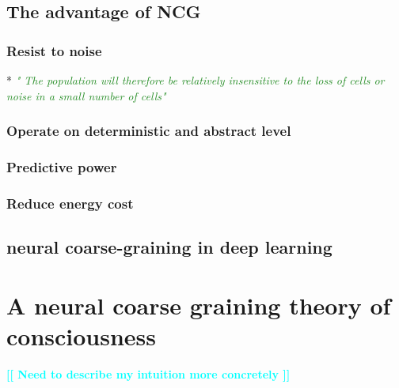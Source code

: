 \documentclass[utf8]{article}
\makeatletter
\newcommand{\rewrite}[1]{\textcolor{ForestGreen}{\textit{"#1"}}\newline}
\newcommand{\toWrite}[1]{\noindent
			\textcolor{Cyan}{\textbf{[[ #1 ]]}}}
\newcommand{\martin}[1]{\todo[color=SpringGreen]{@Martin:\\#1}}
\makeatother
\begin{document}
		\subsection{The advantage of NCG}
			\subsubsection{Resist to noise}
				* \rewrite{ The population will therefore be relatively insensitive to the loss of
					cells or noise in a small number of cells} \cite{eurich2000multidimensional}
		
		
			\subsubsection{Operate on deterministic and abstract level}
			\subsubsection{Predictive power}
			\subsubsection{Reduce energy cost}	
			
		\subsection{neural coarse-graining in deep learning}
			\martin{todo}
			
			

	\section{A neural coarse graining theory of consciousness}
		\toWrite{Need to describe my intuition more concretely }
		
\end{document}
